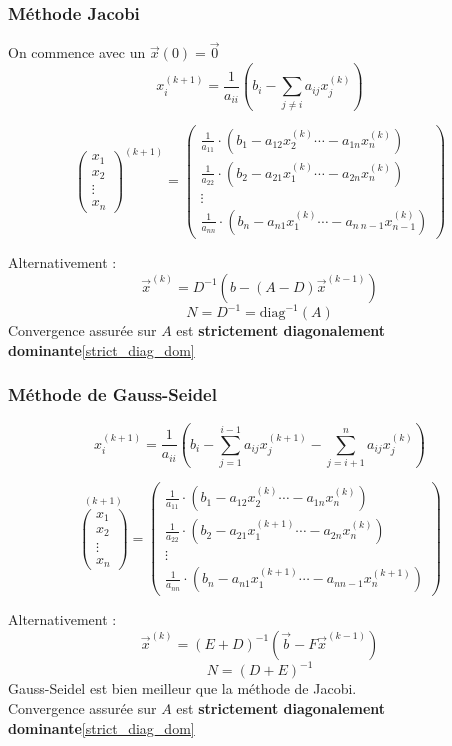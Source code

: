 \documentclass[resume]{subfiles}
\begin{document}
\subsubsection{Méthode Jacobi}
On commence avec un $\vec{x}(0)=\vec{0}$
$$x_i^{(k+1)}=\frac{1}{a_{ii}}\left(b_i-\sum_{j\neq i}a_{ij}x_j^{(k)}\right)$$
\begin{small}
$$\boxed{\begin{pmatrix}x_1\\x_2\\\vdots\\x_n\end{pmatrix}^{(k+1)}=\begin{pmatrix}
\frac{1}{a_{11}}\cdot(b_1-a_{12}x_2^{(k)} \cdots -a_{1n}x_n^{(k)})\\
\frac{1}{a_{22}}\cdot(b_2-a_{21}x_1^{(k)} \cdots -a_{2n}x_n^{(k)})\\
\vdots\\
\frac{1}{a_{nn}}\cdot(b_n-a_{n1}x_1^{(k)} \cdots -a_{n\ n-1}x_{n-1}^{(k)})
\end{pmatrix}}$$
\end{small}
Alternativement :
$$\boxed{\vec{x}^{(k)}=D^{-1}\left(b-(A-D)\vec{x}^{(k-1)}\right)}$$
$$N=D^{-1}=\text{diag}^{-1}(A)$$
Convergence assurée sur $A$ est \textbf{strictement diagonalement dominante}\ref{strict_diag_dom}
\subsubsection{Méthode de Gauss-Seidel}
$$x_i^{(k+1)}=\frac{1}{a_{ii}}\left(b_i-\sum_{j=1}^{i-1}a_{ij}x_j^{(k+1)}-\sum_{j=i+1}^{n}a_{ij}x_j^{(k)}\right)$$
\begin{small}
$$\boxed{\overset{(k+1)}{\begin{pmatrix}x_1\\x_2\\\vdots\\x_n\end{pmatrix}}=\begin{pmatrix}
\frac{1}{a_{11}}\cdot(b_1-a_{12}x_2^{(k)} \cdots -a_{1n}x_n^{(k)})\\
\frac{1}{a_{22}}\cdot(b_2-a_{21}x_1^{(k+1)} \cdots -a_{2n}x_n^{(k)})\\
\vdots\\
\frac{1}{a_{nn}}\cdot(b_n-a_{n1}x_1^{(k+1)} \cdots -a_{nn-1}x_n^{(k+1)})
\end{pmatrix}}$$
\end{small}
Alternativement :
$$\boxed{\vec{x}^{(k)}=(E+D)^{-1}\left(\vec{b}-F\vec{x}^{(k-1)}\right)}$$
$$N=(D+E)^{-1}$$
Gauss-Seidel est bien meilleur que la méthode de Jacobi.\\
Convergence assurée sur $A$ est \textbf{strictement diagonalement dominante}\ref{strict_diag_dom}
\end{document}
